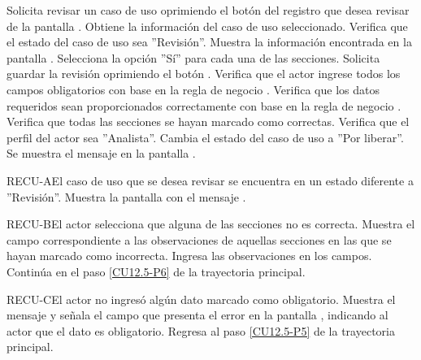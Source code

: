	\begin{UCtrayectoria}
		\UCpaso[\UCactor] Solicita revisar un caso de uso oprimiendo el botón  del registro que desea revisar  de la pantalla .
		\UCpaso[\UCsist] Obtiene la información del caso de uso seleccionado. 
		\UCpaso[\UCsist] Verifica que el estado del caso de uso sea ''Revisión''. 
		\UCpaso[\UCsist] Muestra la información encontrada en la pantalla .
		\UCpaso[\UCactor] Selecciona la opción ''Sí'' para cada una de las secciones.  \label{CU12.5-P5}
		\UCpaso[\UCactor] Solicita guardar la revisión oprimiendo el botón . \label{CU12.5-P6}
		\UCpaso[\UCsist] Verifica que el actor ingrese todos los campos obligatorios con base en la regla de negocio . 
		\UCpaso[\UCsist] Verifica que los datos requeridos sean proporcionados correctamente con base en la regla de negocio .  
		\UCpaso[\UCsist] Verifica que todas las secciones se hayan marcado como correctas. 
		\UCpaso[\UCsist] Verifica que el perfil del actor sea ''Analista''. 
		\UCpaso[\UCsist] Cambia el estado del caso de uso a ''Por liberar''.
		\UCpaso[\UCactor] Se muestra el mensaje  en la pantalla . \label{CU12.5-P12}
	\end{UCtrayectoria}		
	
	\begin{UCtrayectoriaA}{RECU-A}{El caso de uso que se desea revisar se encuentra en un estado diferente a ''Revisión''.}
		\UCpaso[\UCsist] Muestra la pantalla  con el mensaje .
	\end{UCtrayectoriaA}

	\begin{UCtrayectoriaA}{RECU-B}{El actor selecciona que alguna de las secciones no es correcta.}
		\UCpaso[\UCsist] Muestra el campo correspondiente a las observaciones de aquellas secciones en las que se hayan marcado como incorrecta.
		\UCpaso[\UCactor] Ingresa las observaciones en los campos.
		\UCpaso Continúa en el paso \ref{CU12.5-P6} de la trayectoria principal.
	\end{UCtrayectoriaA}

	\begin{UCtrayectoriaA}{RECU-C}{El actor no ingresó algún dato marcado como obligatorio.}
		\UCpaso[\UCsist] Muestra el mensaje  y señala el campo que presenta el error en la pantalla , indicando al actor que el dato es obligatorio.
		\UCpaso Regresa al paso \ref{CU12.5-P5} de la trayectoria principal.
	\end{UCtrayectoriaA}

